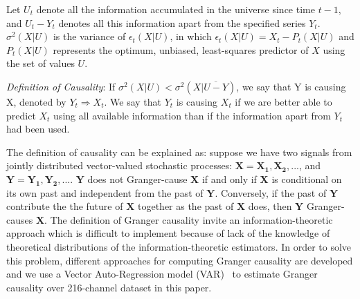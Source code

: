 \documentclass[conference]{IEEEtran}
\begin{document}
Let $U_t$ denote all the information accumulated in the universe since time $t-1$, and $U_t-Y_t$ denotes all this information apart from the specified series $Y_t$. $\sigma^2(X|U)$ is the variance of $\epsilon_t(X|U)$, in which $\epsilon_t(X|U)=X_t-P_t(X|U)$ and $P_t(X|U)$ represents the optimum, unbiased, least-squares predictor of $X$ using the set of values $U$.

\emph{Definition of Causality}: If $\sigma^2(X|U)<\sigma^2(X|\overline{U-Y})$, we say that Y is causing X, denoted by $Y_t \Rightarrow X_t$. We say that $Y_t$ is causing $X_t$ if we are better able to predict $X_t$ using all available information than if the information apart from $Y_t$ had been used.

The definition of causality can be explained as: suppose we have two signals from jointly distributed vector-valued stochastic processes: $\mathbf{X}=\mathbf{X_1}, \mathbf{X_2},...$, and $\mathbf{Y}=\mathbf{Y_1}, \mathbf{Y_2},...$. $\mathbf{Y}$ does not Granger-cause $\mathbf{X}$ if and only if $\mathbf{X}$ is conditional on its own past and independent from the past of $\mathbf{Y}$. Conversely, if the past of $\mathbf{Y}$ contribute the the future of $\mathbf{X}$ together as the past of $\mathbf{X}$ does, then $\mathbf{Y}$ Granger-causes $\mathbf{X}$. The definition of Granger causality invite an information-theoretic approach which is difficult to implement because of lack of the knowledge of theoretical distributions of the information-theoretic estimators. In order to solve this problem, different approaches for computing Granger causality are developed and we use a Vector Auto-Regression model (VAR)~\cite{barnett2014mvgc} to estimate Granger causality over 216-channel dataset in this paper.
\end{document}
